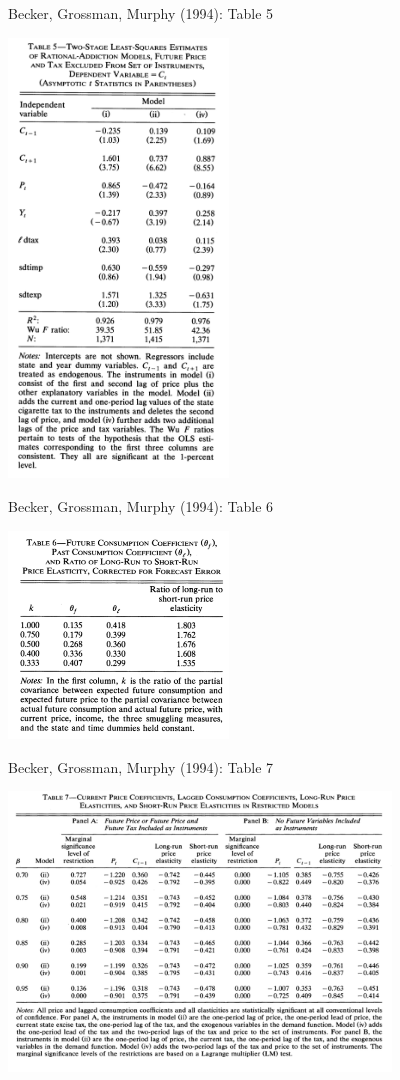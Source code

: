 \documentclass[aspectratio=169]{beamer}
\begin{document}
\begin{frame}{Becker, Grossman, Murphy (1994): Table 5}
\begin{center}
\includegraphics[width=2.3in]{./resources/gbm_t5.png}
\end{center}
\end{frame}

\begin{frame}{Becker, Grossman, Murphy (1994): Table 6}
\begin{center}
\includegraphics[width=2.3in]{./resources/gbm_t6.png}
\end{center}
\end{frame}

\begin{frame}{Becker, Grossman, Murphy (1994): Table 7}
\begin{center}
\includegraphics[width=4in]{./resources/gbm_t7.png}
\end{center}
\end{frame}
\end{document}
